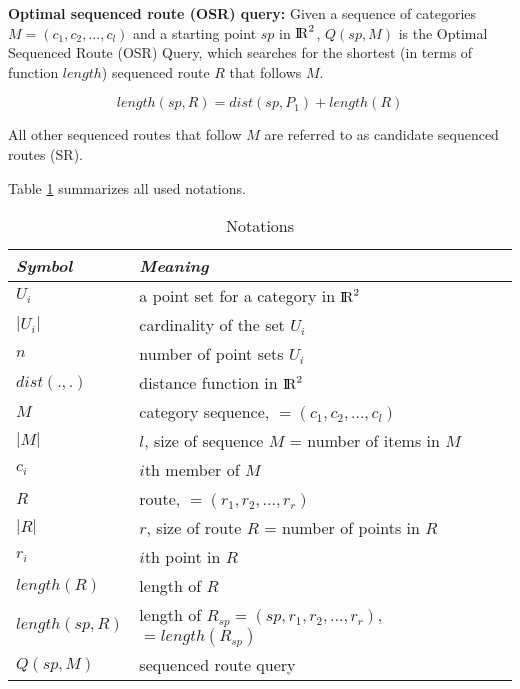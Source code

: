 \textbf{Optimal sequenced route (OSR) query:} Given a sequence of categories $M = (c_1, c_2, ..., c_l)$ and a starting point $sp$ in ${\rm I\!R}^2$, $Q(sp, M)$ is the Optimal Sequenced Route (OSR) Query, which searches for the shortest (in terms of function $length$) sequenced route $R$ that follows $M$.

\begin{equation}
length(sp, R) = dist(sp, P_1) + length(R)
\end{equation}

All other sequenced routes that follow $M$ are referred to as candidate sequenced routes (SR). \newline

Table \ref{table} summarizes all used notations.

\begin{table}[h!]
\centering
	\begin{tabular}{ |l|l| } 
		\hline
		\textit{Symbol} & \textit{Meaning} \\
		\hline
		$U_i$ & a point set for a category in ${\rm I\!R}^2$ \\ 
		\hline
		$|U_i|$ & cardinality of the set $U_i$ \\ 
		\hline
		$n$ & number of point sets $U_i$ \\ 
		\hline
		$dist(., .)$ & distance function in ${\rm I\!R}^2$ \\ 
		\hline
		$M$ & category sequence, $=(c_1, c_2, ..., c_l)$ \\ 
		\hline
		$|M|$ & $l$, size of sequence $M$ = number of items in $M$ \\ 
		\hline
		$c_i$ & $i$th member of $M$ \\ 
		\hline
		$R$ & route, $= (r_1, r_2, ..., r_r)$ \\ 
		\hline
		$|R|$ & $r$, size of route $R$ = number of points in $R$ \\ 
		\hline
		$r_i$ & $i$th point in $R$ \\ 
		\hline
		$length(R)$ & length of $R$ \\ 
		\hline
		$length(sp, R)$ & length of $R_{sp} = (sp, r_1, r_2, ..., r_r)$, $= length(R_{sp})$ \\ 
		\hline
		$Q(sp, M)$ & sequenced route query \\ 
		\hline
	\end{tabular}
\caption{Notations}
\label{table}
\end{table}




